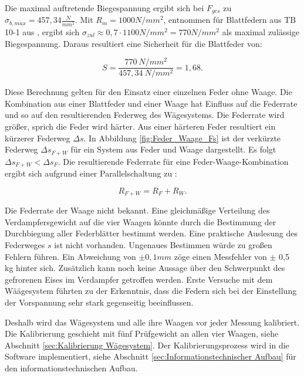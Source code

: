 Die maximal auftretende Biegespannung ergibt sich bei $F_{ges}$ zu  $\sigma_{b,max} = 457,34 \frac{N}{mm^2}.$ Mit $R_m =1000 N/mm^2$, entnommen für Blattfedern aus TB 10-1 aus \citep{Wittel2011}, ergibt sich  $\sigma_{zul}\approx 0,7 \cdot 1100 N/mm^2 = 770 N/mm^2  $ als maximal zulässige Biegespannung. Daraus resultiert eine Sicherheit für die Blattfeder von:

\begin{equation}
S= \frac{770~N/mm^2}{457,34~N/mm^2} = 1,68.
\end{equation}





Diese Berechnung gelten für den Einsatz einer einzelnen Feder ohne Waage. Die Kombination aus einer Blattfeder und einer Waage hat Einfluss auf die Federrate und so auf den resultierenden Federweg des Wägesystems. Die Federrate wird größer, sprich die Feder wird härter. Aus einer härteren Feder resultiert ein kürzerer Federweg $\Delta s$.  In Abbildung \ref{fig:Feder_Waage_Fs} ist der verkürzte Federweg $\Delta s_{F+W}$ für ein System aus Feder und Waage dargestellt. Es folgt $\Delta s_{F+W}< \Delta s_{F}$. Die resultierende Federrate für eine Feder-Waage-Kombination ergibt sich aufgrund einer Parallelschaltung zu :

\begin{equation}
R_{F+W}= R_F + R_W.
\end{equation}

Die Federrate der Waage nicht bekannt. Eine gleichmäßige Verteilung des Verdampfersgewicht auf die vier Waagen könnte durch die Bestimmung der Durchbiegung aller Federblätter bestimmt werden. Eine praktische Auslesung des Federweges $s$ ist nicht vorhanden. Ungenaues Bestimmen würde zu großen Fehlern führen. Ein Abweichung von $\pm 0,1 mm$ zöge einen Messfehler von $\pm$ 0,5 kg hinter sich.  Zusätzlich kann noch keine Aussage über den Schwerpunkt des gefrorenen Eises im Verdampfer getroffen werden.
Erste Versuche mit dem Wäägesystem führten zu der Erkenntnis, dass die Federn sich bei der Einstellung der Vorspannung sehr stark gegenseitig beeinflussen. 
 
Deshalb wird das Wägesystem und alle ihre Waagen vor jeder Messung kalibriert. Die Kalibrierung geschieht mit fünf Prüfgewicht an allen vier Waagen, siehe Abschnitt \ref{sec:Kalibrierung Wägesystem}. Der Kalibrierungsprozess wird in die Software implementiert, siehe Abschnitt \ref{sec:Informationstechnischer Aufbau} für den informationstechnischen Aufbau. 


